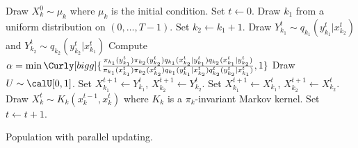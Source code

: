 \begin{algorithm}
\begin{algorithmic}
  \tophrule
    \STATE Draw $X_k^0\sim\mu_k$ where $\mu_k$ is the initial condition.
  \ENDFOR
  \STATE Set $t\leftarrow0$.
  \REPEAT
    \STATE Draw $k_1$ from a uniform distribution on $(0,\dots,T-1)$. Set
    $k_2\leftarrow k_1 + 1$.
    \STATE Draw $Y_{k_1}^t\sim q_{k_1}(y_{k_1}^t|x_{k_2}^t)$ and
    $Y_{k_2}^t\sim q_{k_2}(y_{k_2}^t|x_{k_1}^t)$
    \STATE Compute $\alpha = \min\Curly[bigg]{
      \frac{\pi_{k_1}(y_{k_1}^t)\pi_{k_2}(y_{k_2}^t)
        q_{k_1}(x_{k_2}^t|y_{k_1}^t)q_{k_2}(x_{k_1}^t|y_{k_2}^t)}
      {\pi_{k_1}(x_{k_1}^t)\pi_{k_2}(x_{k_2}^t)
        q_{k_1}(y_{k_1}^t|x_{k_2}^t)q_{k_2}^t(y_{k_2}^t|x_{k_1}^t)}, 1}$
    \STATE Draw $U\sim\calU[0,1]$.
      \STATE Set $X_{k_1}^{t+1}\leftarrow Y_{k_1}^t$, $X_{k_2}^{t+1}\leftarrow
          Y_{k_2}^t$.
    \ELSE
      \STATE Set $X_{k_1}^{t+1}\leftarrow X_{k_1}^t$, $X_{k_2}^{t+1}\leftarrow
          X_{k_2}^t$.
    \ENDIF
      \STATE Draw $X_k^t\sim K_k(x_k^{t-1},x_k^t)$ where $K_k$ is a
      $\pi_k$-invariant Markov kernel.
    \ENDFOR
    \STATE Set $t\leftarrow t+1$.
  \bottomhrule
\end{algorithmic}
\caption{Population \mcmc with parallel updating.}
\label{alg:pmcmc}
\end{algorithm}
